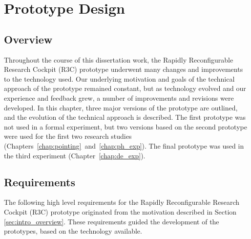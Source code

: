 \chapter{Prototype Design}
\label{chap:prototype}

\section{Overview}

Throughout the course of this dissertation work, the Rapidly Reconfigurable Research Cockpit (R3C) prototype underwent many changes and improvements to the technology used.
Our underlying motivation and goals of the technical approach of the prototype remained constant, but as technology evolved and our experience and feedback grew, a number of improvements and revisions were developed.
In this chapter, three major versions of the prototype are outlined, and the evolution of the technical approach is described.
The first prototype was not used in a formal experiment, but two versions based on the second prototype were used for the first two research studies (Chapters~\ref{chap:pointing}~and~\ref{chap:ph_exp}).
The final prototype was used in the third experiment (Chapter~\ref{chap:de_exp}).

\section{Requirements}

The following high level requirements for the Rapidly Reconfigurable Research Cockpit (R3C) prototype originated from the motivation described in Section \ref{sec:intro_overview}.
These requirements guided the development of the prototypes, based on the technology available.

